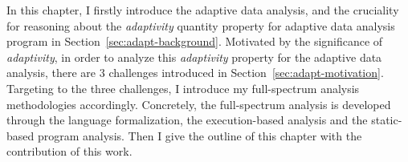 
In this chapter, 
I firstly introduce the adaptive data analysis, and the cruciality for reasoning about the \emph{adaptivity} quantity property 
for adaptive data analysis program in Section~\ref{sec:adapt-background}.
Motivated by the significance of \emph{adaptivity},
in order to analyze this \emph{adaptivity} property for the adaptive data analysis, there are 3 challenges
introduced in Section~\ref{sec:adapt-motivation}.
Targeting to the three challenges, I introduce my full-spectrum analysis methodologies accordingly.
Concretely, the full-spectrum analysis is developed through the language formalization,
the execution-based analysis and the static-based program analysis.
Then I give the outline of this chapter with the contribution of this work.






